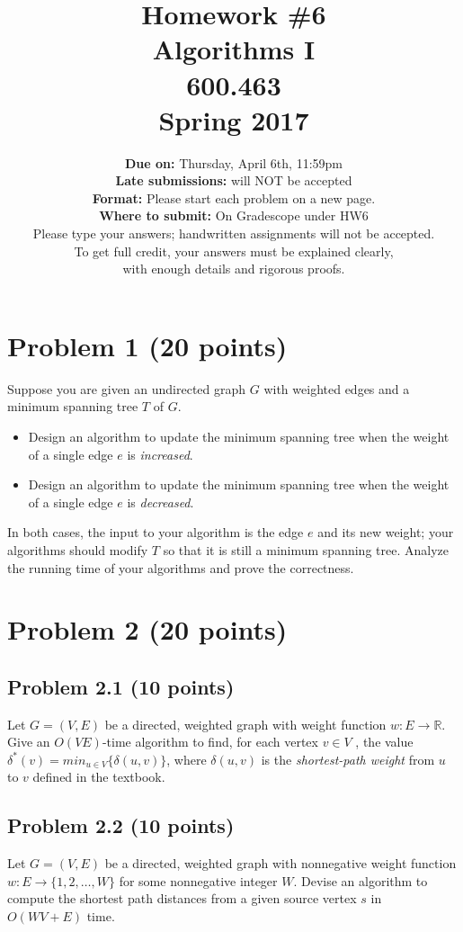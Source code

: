 \documentclass[letterpaper, 11pt]{article}
\begin{document}
\title{Homework \#6 \\ Algorithms I \\ 600.463 \\Spring 2017}
\author{\textbf{Due on:} Thursday, April 6th, 11:59pm \\
\textbf{Late submissions:} will NOT be accepted\\
\textbf{Format:} Please start each problem on a new page.
\\\textbf{Where to submit:} On Gradescope under HW6
\\ Please type your answers; handwritten assignments will not be accepted.
\\ To get full credit, your answers must be explained clearly,\\ with enough details
and rigorous proofs.
\\}

\maketitle


\section*{Problem 1 (20 points)}
Suppose you are given an undirected graph $G$ with weighted edges and a minimum spanning tree $T$ of $G$.
\begin{itemize}
\item Design an algorithm to update the minimum spanning tree when the weight of a single edge $e$ is \textit{increased}.
\item Design an algorithm to update the minimum spanning tree when the weight of a single edge $e$ is \textit{decreased}.
\end{itemize}
In both cases, the input to your algorithm is the edge $e$ and its new weight; your algorithms should modify $T$ so that it is still a minimum spanning tree. Analyze the running time of your algorithms and prove the correctness.

\section*{Problem 2 (20 points)}
\subsection*{Problem 2.1 (10 points)}
Let $G = (V,E)$ be a directed, weighted graph with weight function $w: E \to \mathbb{R}$. Give an $O(V E)$-time algorithm to find, for each vertex $v\in V$ , the value  $\delta^*(v) = min_{u \in V}\{\delta(u,v)\}$, where $\delta(u,v)$ is the \textit{shortest-path weight} from $u$ to $v$ defined in the textbook.


\subsection*{Problem 2.2 (10 points)}
Let $G = (V,E)$ be a directed, weighted graph with nonnegative weight function $w: E \to \{1,2,\dots,W\}$ for some nonnegative integer $W$. Devise an algorithm to compute the shortest path distances from a given source vertex $s$ in $O(W V + E)$ time.
\end{document}
